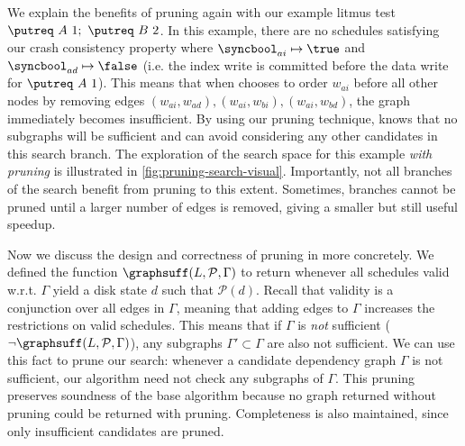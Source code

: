 We explain the benefits of pruning again with our example litmus test
$ \putreq\ A\ 1;\ \putreq\ B\ 2$.
In this example, there are no schedules satisfying our crash consistency property
where $\syncbool_{ai}\mapsto\true$ and $\syncbool_{ad}\mapsto\false$
(i.e. the index write is committed before the data write for $\putreq\ A\ 1$).
This means that when \sccsearch chooses to order $w_{ai}$ before all other nodes
by removing edges $(w_{ai}, w_{ad}),(w_{ai}, w_{bi}),(w_{ai}, w_{bd})$,
the graph immediately becomes insufficient.
By using our pruning technique, \depsynth knows that no subgraphs will be
sufficient and can avoid considering any other candidates in this search branch.
The exploration of the search space for this example \textit{with pruning}
is illustrated in \autoref{fig:pruning-search-visual}.
Importantly, not all branches of the search benefit from pruning to this extent.
Sometimes, branches cannot be pruned until a larger number of edges is removed,
giving a smaller but still useful speedup.

Now we discuss the design and correctness of pruning in \sccsearch more concretely.
We defined the function $\graphsuff(L, \mathcal{P}, \Gamma)$ to return \true whenever all schedules
valid w.r.t. $\Gamma$ yield a disk state $d$ such that $\mathcal{P}(d)$. Recall that validity is a conjunction
over all edges in $\Gamma$, meaning that adding edges to $\Gamma$ increases the restrictions on valid schedules.
This means that if $\Gamma$ is \textit{not} sufficient ($\neg \graphsuff(L, \mathcal{P}, \Gamma)$),
any subgraphs $\Gamma'\subset\Gamma$ are also not sufficient.
We can use this fact to prune our search: whenever a candidate dependency graph $\Gamma$ is not sufficient,
our algorithm need not check any subgraphs of $\Gamma$.
This pruning preserves soundness of the base algorithm because no graph returned without pruning
could be returned with pruning.
Completeness is also maintained, since only insufficient candidates are pruned.


